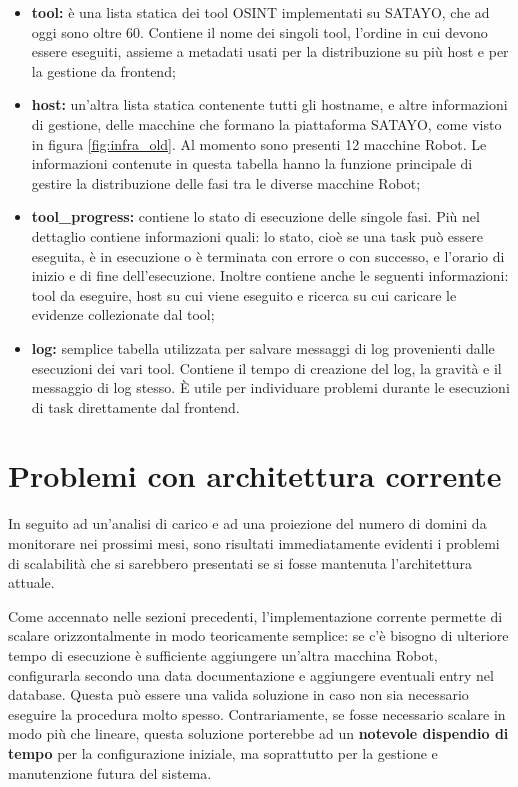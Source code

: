 \begin{itemize}
  \item \textbf{tool:} è una lista statica dei tool OSINT implementati su SATAYO,
    che ad oggi sono oltre 60. Contiene il nome dei singoli tool, l'ordine in
    cui devono essere eseguiti, assieme a metadati usati per la distribuzione su
    più host e per la gestione da frontend;

  \item \textbf{host:} un'altra lista statica contenente tutti gli hostname, e altre
    informazioni di gestione, delle macchine che formano la piattaforma SATAYO, come
    visto in figura \ref{fig:infra_old}. Al momento sono presenti 12 macchine
    Robot. Le informazioni contenute in questa tabella hanno la funzione principale
    di gestire la distribuzione delle fasi tra le diverse macchine Robot;

  \item \textbf{tool\_progress:} contiene lo stato di esecuzione delle singole
    fasi. Più nel dettaglio contiene informazioni quali: lo stato, cioè se una task
    può essere eseguita, è in esecuzione o è terminata con errore o con successo,
    e l'orario di inizio e di fine dell'esecuzione. Inoltre contiene anche le
    seguenti informazioni: tool da eseguire, host su cui viene eseguito e
    ricerca su cui caricare le evidenze collezionate dal tool;

  \item \textbf{log:} semplice tabella utilizzata per salvare messaggi di log
    provenienti dalle esecuzioni dei vari tool. Contiene il tempo di creazione del
    log, la gravità e il messaggio di log stesso. È utile per individuare problemi
    durante le esecuzioni di task direttamente dal frontend.
\end{itemize}

\section{Problemi con architettura corrente}
\label{sec:problemi}

In seguito ad un'analisi di carico e ad una proiezione del numero di domini da monitorare
nei prossimi mesi, sono risultati immediatamente evidenti i problemi di
scalabilità che si sarebbero presentati se si fosse mantenuta l'architettura
attuale.

Come accennato nelle sezioni precedenti, l'implementazione corrente permette di scalare
orizzontalmente in modo teoricamente semplice: se c'è bisogno di ulteriore tempo
di esecuzione è sufficiente aggiungere un'altra macchina Robot, configurarla secondo
una data documentazione e aggiungere eventuali entry nel database. Questa può
essere una valida soluzione in caso non sia necessario eseguire la procedura
molto spesso. Contrariamente, se fosse necessario scalare in modo più che
lineare, questa soluzione porterebbe ad un \textbf{notevole dispendio di tempo}
per la configurazione iniziale, ma soprattutto per la gestione e manutenzione futura
del sistema.

